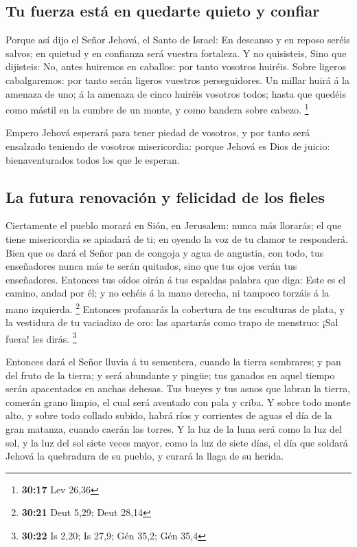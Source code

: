 \hypertarget{tu-fuerza-estuxe1-en-quedarte-quieto-y-confiar}{%
\subsection{Tu fuerza está en quedarte quieto y
confiar}\label{tu-fuerza-estuxe1-en-quedarte-quieto-y-confiar}}

 Porque así dijo el Señor Jehová, el Santo de Israel: En
descanso y en reposo seréis salvos; en quietud y en confianza será
vuestra fortaleza. Y no quisisteis,  Sino que dijisteis:
No, antes huiremos en caballos: por tanto vosotros huiréis. Sobre
ligeros cabalgaremos: por tanto serán ligeros vuestros perseguidores.
 Un millar huirá á la amenaza de uno; á la amenaza de
cinco huiréis vosotros todos; hasta que quedéis como mástil en la cumbre
de un monte, y como bandera sobre cabezo. \footnote{\textbf{30:17} Lev
  26,36}

 Empero Jehová esperará para tener piedad de vosotros, y
por tanto será ensalzado teniendo de vosotros misericordia: porque
Jehová es Dios de juicio: bienaventurados todos los que le esperan.

\hypertarget{la-futura-renovaciuxf3n-y-felicidad-de-los-fieles}{%
\subsection{La futura renovación y felicidad de los
fieles}\label{la-futura-renovaciuxf3n-y-felicidad-de-los-fieles}}

 Ciertamente el pueblo morará en Sión, en Jerusalem:
nunca más llorarás; el que tiene misericordia se apiadará de ti; en
oyendo la voz de tu clamor te responderá.  Bien que os
dará el Señor pan de congoja y agua de angustia, con todo, tus
enseñadores nunca más te serán quitados, sino que tus ojos verán tus
enseñadores.  Entonces tus oídos oirán á tus espaldas
palabra que diga: Este es el camino, andad por él; y no echéis á la mano
derecha, ni tampoco torzáis á la mano izquierda. \footnote{\textbf{30:21}
  Deut 5,29; Deut 28,14}  Entonces profanarás la
cobertura de tus esculturas de plata, y la vestidura de tu vaciadizo de
oro: las apartarás como trapo de menstruo: ¡Sal fuera! les dirás.
\footnote{\textbf{30:22} Is 2,20; Is 27,9; Gén 35,2; Gén 35,4}

 Entonces dará el Señor lluvia á tu sementera, cuando la
tierra sembrares; y pan del fruto de la tierra; y será abundante y
pingüe; tus ganados en aquel tiempo serán apacentados en anchas dehesas.
 Tus bueyes y tus asnos que labran la tierra, comerán
grano limpio, el cual será aventado con pala y criba.  Y
sobre todo monte alto, y sobre todo collado subido, habrá ríos y
corrientes de aguas el día de la gran matanza, cuando caerán las torres.
 Y la luz de la luna será como la luz del sol, y la luz
del sol siete veces mayor, como la luz de siete días, el día que soldará
Jehová la quebradura de su pueblo, y curará la llaga de su herida.

